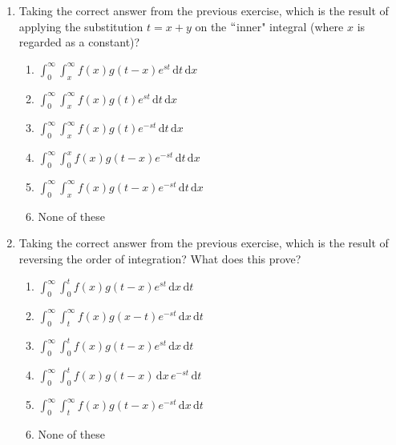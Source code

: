 \documentclass{ximera}
\begin{document}
\begin{enumerate}[label=(\arabic*)]

\item Taking the correct answer from the previous exercise, which is the result of applying the substitution $t=x+y$ on the $``$inner" integral (where $x$ is regarded as a constant)?
    
    
\begin{enumerate}[label=(\alph*)]
\item $\displaystyle \int_0^{\infty}\int_x^{\infty}f(x)g(t-x)e^{st}\,\mathrm{d}t\,\mathrm{d}x$
\item $\displaystyle \int_0^{\infty}\int_x^{\infty}f(x)g(t)e^{st}\,\mathrm{d}t\,\mathrm{d}x$
\item $\displaystyle \int_0^{\infty}\int_x^{\infty}f(x)g(t)e^{-st}\,\mathrm{d}t\,\mathrm{d}x$
\item $\displaystyle \int_0^{\infty}\int_0^x f(x)g(t-x)e^{-st}\,\mathrm{d}t\,\mathrm{d}x$  
\item $\displaystyle \int_0^{\infty}\int_x^{\infty}f(x)g(t-x)e^{-st}\,\mathrm{d}t\,\mathrm{d}x$  %
\item None of these
\end{enumerate}




\newpage


\item Taking the correct answer from the previous exercise, which is the result of reversing the order of integration? What does this prove?

\begin{enumerate}[label=(\alph*)]
\item $\displaystyle \int_0^{\infty}\int_0^tf(x)g(t-x)e^{st}\,\mathrm{d}x\,\mathrm{d}t$
\item $\displaystyle \int_0^{\infty}\int_t^{\infty}f(x)g(x-t)e^{-st}\,\mathrm{d}x\,\mathrm{d}t$
\item $\displaystyle \int_0^{\infty}\int_0^tf(x)g(t-x)e^{st}\,\mathrm{d}x\,\mathrm{d}t$
\item $\displaystyle \int_0^{\infty}\int_0^tf(x)g(t-x)\,\mathrm{d}x\,e^{-st}\,\mathrm{d}t$  %
\item $\displaystyle \int_0^{\infty}\int_t^{\infty} f(x)g(t-x)e^{-st}\,\mathrm{d}x\,\mathrm{d}t$
\item None of these
\end{enumerate}









\end{enumerate}
\end{document}
